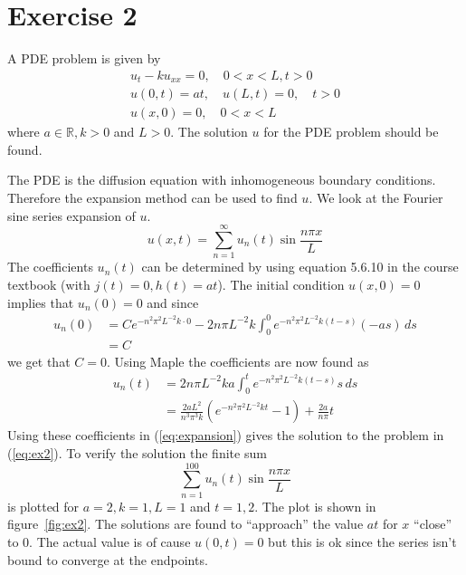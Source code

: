 \documentclass[11pt]{article}
\newcommand\myreal{\mathbb{R}}
\begin{document}
\section*{Exercise 2}
A PDE problem is given by
\begin{gather}
    u_t - ku_{xx} = 0, \quad 0 < x < L, t>0 \nonumber\\
    u(0,t)=at,\quad u(L,t)=0, \quad t > 0 \label{eq:ex2}\\
    u(x, 0) = 0, \quad 0 < x < L \nonumber
\end{gather}
where $a\in\myreal, k>0$ and $L>0$. The solution $u$ for the PDE problem should be found. \par
The PDE is the diffusion equation with inhomogeneous boundary conditions. Therefore the expansion method can be used to find $u$. We look at the Fourier sine series expansion of $u$.
\begin{equation}\label{eq:expansion}
    u(x,t) = \sum_{n=1}^\infty u_n(t)\sin\frac{n\pi x}{L}
\end{equation}
The coefficients $u_n(t)$ can be determined by using equation 5.6.10 in the course textbook (with $j(t)=0, h(t)=at$). The initial condition $u(x,0)=0$ implies that $u_n(0)=0$ and since
\begin{align*}
    u_n(0) &= Ce^{-n^2\pi^2L^{-2}k\cdot0} - 2n\pi L^{-2}k\int_0^0 e^{-n^2\pi^2L^{-2}k(t-s)}(-as)\,ds \\
           &= C
\end{align*}
we get that $C=0$. Using Maple the coefficients are now found as
\begin{align*}
    u_n(t) &= 2n\pi L^{-2}ka\int_0^t e^{-n^2\pi^2L^{-2} k(t-s)}s\,ds \\
    &= \frac{2aL^2}{n^3\pi^3k}(e^{-n^2\pi^2L^{-2}kt} - 1) + \frac{2a}{n\pi}t
\end{align*}
Using these coefficients in (\ref{eq:expansion}) gives the solution to the problem in (\ref{eq:ex2}). To verify the solution the finite sum
\begin{equation*}
    \sum_{n=1}^{100} u_n(t)\sin\frac{n\pi x}{L}
\end{equation*}
is plotted for $a=2, k=1, L=1$ and $t={1,2}$. The plot is shown in figure~\ref{fig:ex2}. The solutions are found to ``approach'' the value $at$ for $x$ ``close'' to 0. The actual value is of cause $u(0, t)=0$ but this is ok since the series isn't bound to converge at the endpoints.
\end{document}
